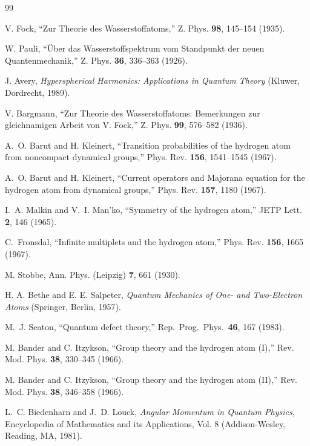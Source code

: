 \documentclass[aps,pra,twocolumn,superscriptaddress,longbibliography]{revtex4-2}
\begin{document}

\begin{thebibliography}{99}

V. Fock,
``Zur Theorie des Wasserstoffatoms,''
Z. Phys. \textbf{98}, 145--154 (1935).

W. Pauli,
``\"Uber das Wasserstoffspektrum vom Standpunkt der neuen Quantenmechanik,''
Z. Phys. \textbf{36}, 336--363 (1926).

J. Avery,
\textit{Hyperspherical Harmonics: Applications in Quantum Theory}
(Kluwer, Dordrecht, 1989).

V. Bargmann,
``Zur Theorie des Wasserstoffatoms: Bemerkungen zur gleichnamigen Arbeit von V. Fock,''
Z. Phys. \textbf{99}, 576--582 (1936).

A.~O. Barut and H. Kleinert,
``Transition probabilities of the hydrogen atom from noncompact dynamical groups,''
Phys. Rev. \textbf{156}, 1541--1545 (1967).

A.~O. Barut and H. Kleinert,
``Current operators and Majorana equation for the hydrogen atom from dynamical groups,''
Phys. Rev. \textbf{157}, 1180 (1967).

I.~A. Malkin and V.~I. Man'ko,
``Symmetry of the hydrogen atom,''
JETP Lett. \textbf{2}, 146 (1965).

C.~Fronsdal,
``Infinite multiplets and the hydrogen atom,''
Phys. Rev. \textbf{156}, 1665 (1967).

M. Stobbe,
Ann. Phys. (Leipzig) \textbf{7}, 661 (1930).

H. A. Bethe and E. E. Salpeter,
\textit{Quantum Mechanics of One- and Two-Electron Atoms}
(Springer, Berlin, 1957).

M.~J. Seaton,
``Quantum defect theory,''
Rep.~Prog.~Phys.~\textbf{46}, 167 (1983).

M. Bander and C. Itzykson,
``Group theory and the hydrogen atom (I),''
Rev. Mod. Phys. \textbf{38}, 330--345 (1966).

M. Bander and C. Itzykson,
``Group theory and the hydrogen atom (II),''
Rev. Mod. Phys. \textbf{38}, 346--358 (1966).

L.~C. Biedenharn and J.~D. Louck,
\textit{Angular Momentum in Quantum Physics},
Encyclopedia of Mathematics and its Applications, Vol. 8 (Addison-Wesley, Reading, MA, 1981).


\end{thebibliography}
\end{document}
